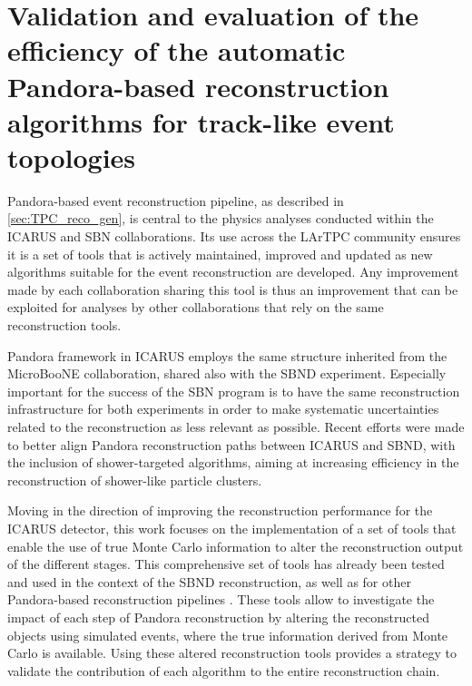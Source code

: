 
\chapter[Validating and evaluating the efficiency of Pandora reconstruction]{Validation and evaluation of the efficiency of the automatic Pandora-based reconstruction algorithms for track-like event topologies}\label{chap:methods}

Pandora-based event reconstruction pipeline, as described in \autoref{sec:TPC_reco_gen}, is central to the physics analyses conducted within the ICARUS and SBN collaborations. Its use across the LArTPC community ensures it is a set of tools that is actively maintained, improved and updated as new algorithms suitable for the event reconstruction are developed. Any improvement made by each collaboration sharing this tool is thus an improvement that can be exploited for analyses by other collaborations that rely on the same reconstruction tools.

Pandora framework in ICARUS employs the same structure inherited from the MicroBooNE collaboration, shared also with the SBND experiment. Especially important for the success of the SBN program is to have the same reconstruction infrastructure for both experiments in order to make systematic uncertainties related to the reconstruction as less relevant as possible.  Recent efforts were made to better align Pandora reconstruction paths between ICARUS and SBND, with the inclusion of shower-targeted algorithms, aiming at increasing efficiency in the reconstruction of shower-like particle clusters. 

Moving in the direction of improving the reconstruction performance for the ICARUS detector, this work focuses on the implementation of a set of tools that enable the use of true Monte Carlo information to alter the reconstruction output of the different stages. This comprehensive set of tools has already been tested and used in the context of the SBND reconstruction, as well as for other Pandora-based reconstruction pipelines \cite{Mawby:2023nws, Nguyen:2023_cheatingPandora}. These tools allow to investigate the impact of each step of Pandora reconstruction by altering the reconstructed objects using simulated events, where the true information derived from Monte Carlo is available. Using these altered reconstruction tools provides a strategy to validate the contribution of each algorithm to the entire reconstruction chain. 

